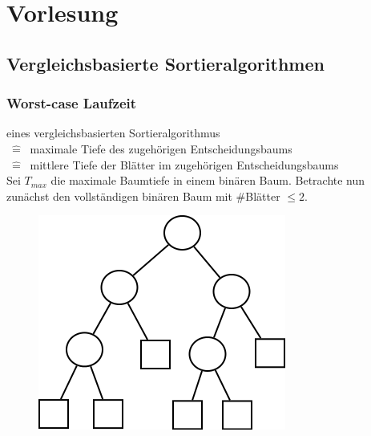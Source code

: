 \newcommand{\hl}[1]{\colorbox{yellow}{#1}}

\chapter{Vorlesung}
\section{Vergleichsbasierte Sortieralgorithmen}

\subsection{Worst-case Laufzeit}

eines vergleichsbasierten Sortieralgorithmus \\$~\hat{=}~$ maximale Tiefe des zugehörigen Entscheidungsbaums \\$~\hat{=}~$ mittlere Tiefe der Blätter im zugehörigen Entscheidungsbaums\\

Sei $T_{max}$ die maximale Baumtiefe in einem binären Baum. 
Betrachte nun zunächst den vollständigen binären Baum mit \#Blätter $\leq 2$. \\


\begin{figure}
\vspace{-50pt}
\includegraphics[width=\linewidth]{09/Grafik/img1.png}
\caption{}
\end{figure}

